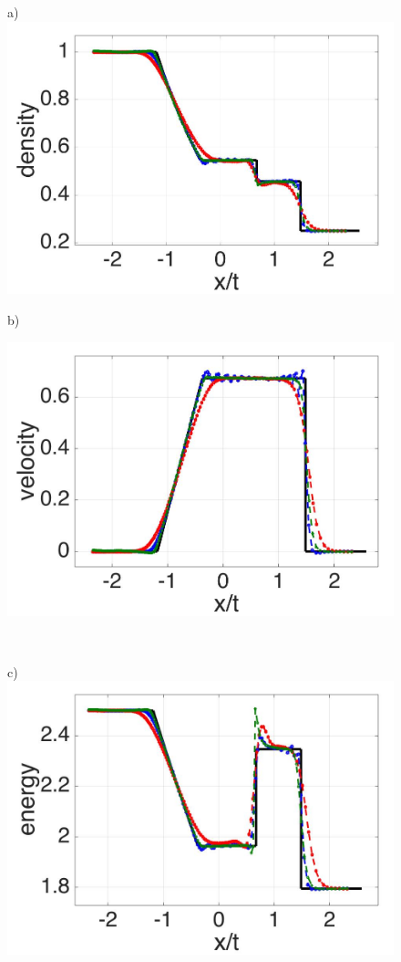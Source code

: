 \begin{figure}[H]
    \centering
    \begin{minipage}{.45\textwidth}
        \centering a)
        \includegraphics[width=0.99 \textwidth,height=0.6\textwidth]{./Figures/RCM-Sod-GSPH2-compare-rho}
    \end{minipage}%
    \begin{minipage}{.545\textwidth}
    \centering b)
        \begin{flushleft}
        \includegraphics[width= 0.8174 \textwidth, height=0.4954 \textwidth]{./Figures/RCM-Sod-GSPH2-compare-v}    
        \end{flushleft}
    \end{minipage}%
    \\
    \begin{minipage}{.45\textwidth}
        \centering c)
        \includegraphics[width=0.99 \textwidth,height=0.6\textwidth]{./Figures/RCM-Sod-GSPH2-compare-e}

\end{minipage}
\end{figure}
